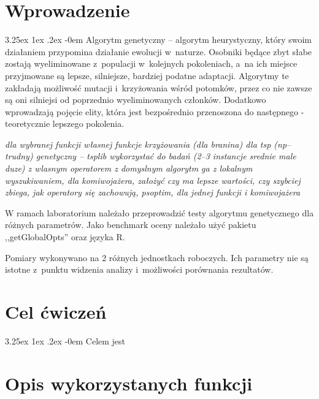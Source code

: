 \documentclass[11pt, a4paper]{article}
\date{\today}
\makeatletter
\newcommand{\fbi}{\leavevmode{\parindent=1em\indent}}
\renewcommand\paragraph{\@startsection{paragraph}{5}{\z@}
  {3.25ex \@plus1ex \@minus.2ex}
  {-0em}
  {\normalfont\normalsize\bfseries}}
\makeatother
\begin{document}


\tableofcontents

\newpage
\section{Wprowadzenie}
\paragraph{}
Algorytm genetyczny – algorytm heurystyczny, który swoim działaniem przypomina działanie ewolucji w~naturze. Osobniki będące zbyt słabe zostają wyeliminowane z~populacji w~kolejnych pokoleniach, a~na ich miejsce przyjmowane są lepsze, silniejsze, bardziej podatne adaptacji. Algorytmy te zakładają możliwość mutacji i~krzyżowania wśród potomków, przez co nie zawsze są oni silniejsi od poprzednio wyeliminowanych członków. Dodatkowo wprowadzają pojęcie elity, która jest bezpośrednio przenoszona do następnego - teoretycznie lepszego pokolenia.



\textit{dla wybranej funkcji własnej funkcje krzyżowania (dla branina)
dla tsp (np--trudny) genetyczny -- tsplib wykorzystać do badań (2--3 instancje srednie male duze) z wlasnym operatorem z domyslnym
algorytm ga z lokalnym wyszukiwaniem, dla komiwojażera, założyć czy ma lepsze wartości, czy szybciej zbiega, jak operatory się zachowują,
psoptim, dla jednej funkcji i komiwojażera}



\fbi
W ramach laboratorium należało przeprowadzić testy algorytmu genetycznego dla różnych parametrów. Jako benchmark oceny należało użyć pakietu ,,getGlobalOpts'' oraz języka R.

\fbi
Pomiary wykonywano na 2 różnych jednostkach roboczych. Ich parametry nie są istotne z~punktu widzenia analizy i~możliwości porównania rezultatów.


\newpage
\section{Cel ćwiczeń}
\paragraph{}
Celem jest

\newpage
\section{Opis wykorzystanych funkcji}
\end{document}
